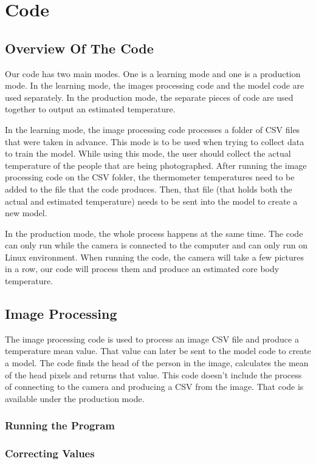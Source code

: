 \section*{Code}
\subsection*{Overview Of The Code}
Our code has two main modes. One is a learning mode and one is a production mode. In the learning mode, the images processing code and the model code are used separately. In the production mode, the separate pieces of code are used together to output an estimated temperature. 

In the learning mode, the image processing code processes a folder of CSV files that were taken in advance. This mode is to be used when trying to collect data to train the model. While using this mode, the user should collect the actual temperature of the people that are being photographed. After running the image processing code on the CSV folder, the thermometer temperatures need to be added to the file that the code produces. Then, that file (that holds both the actual and estimated temperature) needs to be sent into the model to create a new model. 

In the production mode, the whole process happens at the same time. The code can only run while the camera is connected to the computer and can only run on Linux environment. When running the code, the camera will take a few pictures in a row, our code will process them and produce an estimated core body temperature. 

\subsection*{Image Processing}
The image processing code is used to process an image CSV file and produce a temperature mean value. That value can later be sent to the model code to create a model. The code finds the head of the person in the image, calculates the mean of the head pixels and returns that value. This code doesn’t include the process of connecting to the camera and producing a CSV from the image. That code is available under the production mode. 

\subsubsection*{Running the Program}
\subsubsection*{Correcting Values}
